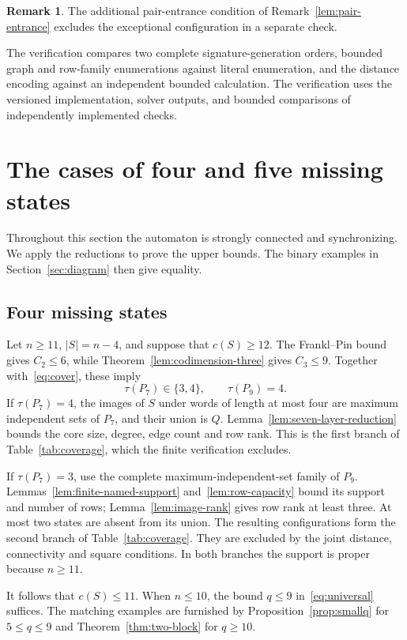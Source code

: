 \documentclass[11pt]{article}
\theoremstyle{definition}
\newtheorem{remark}[theorem]{Remark}
\theoremstyle{plain}
\begin{document}
\begin{remark}
The additional pair-entrance condition of
Remark~\ref{lem:pair-entrance} excludes the exceptional configuration
in a separate check.
\end{remark}

The verification compares two complete signature-generation orders,
bounded graph and row-family enumerations against literal enumeration,
and the distance encoding against an independent bounded calculation.
The verification uses the versioned implementation, solver outputs,
and bounded comparisons of independently implemented checks.

\section{The cases of four and five missing states}\label{sec:cases}
Throughout this section the automaton is strongly connected and synchronizing.
We apply the reductions to prove the upper bounds. The binary
examples in Section~\ref{sec:diagram} then give equality.

\subsection{Four missing states}\label{sec:m4}
Let $n\ge11$, $|S|=n-4$, and suppose that $c(S)\ge12$.
The Frankl--Pin bound gives $C_2\le6$, while
Theorem~\ref{lem:codimension-three} gives $C_3\le9$.
Together with~\eqref{eq:cover}, these imply
\[
 \tau(P_7)\in\{3,4\},\qquad \tau(P_9)=4.
\]
If $\tau(P_7)=4$, the images of $S$ under words of length at most
four are maximum independent sets of $P_7$, and their union is $Q$.
Lemma~\ref{lem:seven-layer-reduction} bounds the core size, degree,
edge count and row rank. This is the first branch of
Table~\ref{tab:coverage}, which the finite verification excludes.

If $\tau(P_7)=3$, use the complete maximum-independent-set family of
$P_9$. Lemmas~\ref{lem:finite-named-support} and~\ref{lem:row-capacity}
bound its support and number of rows; Lemma~\ref{lem:image-rank}
gives row rank at least three. At most two states are absent from
its union. The resulting configurations form the second branch of
Table~\ref{tab:coverage}. They are excluded by the joint distance,
connectivity and square conditions. In both branches the support is
proper because $n\ge11$.

It follows that $c(S)\le11$. When $n\le10$, the bound $q\le9$
in~\eqref{eq:universal} suffices. The matching examples are furnished
by Proposition~\ref{prop:smallq} for $5\le q\le9$ and
Theorem~\ref{thm:two-block} for $q\ge10$.
\end{document}
